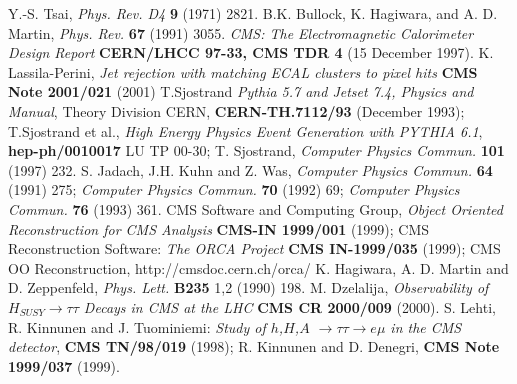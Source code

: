\documentclass[a4paper,12pt,titlepage]{article}
\begin{document}
\begin{thebibliography}{99}
 Y.-S. Tsai, \emph{Phys. Rev. D4} {\bf 9} (1971) 2821.
 B.K. Bullock, K. Hagiwara, and A. D. Martin, \emph{Phys. Rev.} {\bf 67} (1991) 3055.
 \emph{CMS: The Electromagnetic Calorimeter Design Report} {\bf CERN/LHCC 97-33, CMS TDR 4} (15 December 1997).
 K. Lassila-Perini, \emph{Jet rejection with matching ECAL clusters to pixel hits} {\bf CMS Note 2001/021} (2001)
 T.Sjostrand \emph{Pythia 5.7 and Jetset 7.4, Physics and Manual}, Theory Division CERN, {\bf CERN-TH.7112/93} (December 1993); T.Sjostrand et al., \emph{High Energy Physics Event Generation with PYTHIA 6.1}, {\bf hep-ph/0010017} LU TP 00-30; T. Sjostrand, \emph{Computer Physics Commun.} {\bf 101} (1997) 232.
 S. Jadach, J.H. Kuhn and Z. Was, \emph{Computer Physics Commun.} {\bf 64} (1991) 275; \emph{Computer Physics Commun.} {\bf 70} (1992) 69; \emph{Computer Physics Commun.} {\bf 76} (1993) 361.
 CMS Software and Computing Group, \emph{Object Oriented Reconstruction for CMS Analysis} {\bf CMS-IN 1999/001} (1999); CMS Reconstruction Software: \emph{The ORCA Project} {\bf CMS IN-1999/035} (1999); CMS OO Reconstruction, http://cmsdoc.cern.ch/orca/
 K. Hagiwara, A. D. Martin and D. Zeppenfeld, \emph{Phys. Lett.} {\bf B235} 1,2 (1990) 198. 
 M. Dzelalija, \emph{Observability of $H_{SUSY} \rightarrow \tau \tau$ Decays in CMS at the LHC} {\bf CMS CR 2000/009} (2000).
 S. Lehti, R. Kinnunen and J. Tuominiemi: \emph{Study of $h$,$H$,$A$ $\rightarrow \tau \tau \rightarrow e \mu$ in the CMS detector}, {\bf CMS TN/98/019} (1998); R. Kinnunen and D. Denegri, {\bf CMS Note 1999/037} (1999). 

\end{thebibliography}
\end{document}
